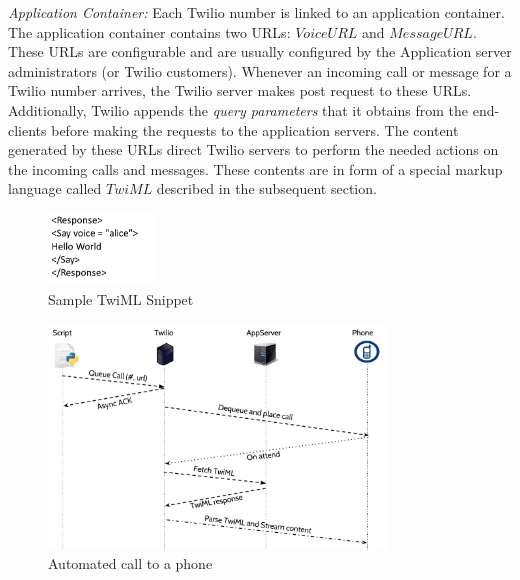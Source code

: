 \emph{Application Container: } Each Twilio number is linked to an application container. The application container contains two URLs: $Voice URL$ and $Message URL$. These URLs are configurable and are usually configured by the Application server administrators (or Twilio customers). Whenever an incoming call or message for a Twilio number arrives, the Twilio server makes post request to these URLs. Additionally, Twilio appends the \textit{query parameters} that it obtains from the end-clients before making the requests to the application servers. The content generated by these URLs direct Twilio servers to perform the needed actions on the incoming calls and messages. These contents are in form of a special markup language called $TwiML$ described in the subsequent section.  
 \begin{figure}
 \centering
   \includegraphics[width=0.25\textwidth]{figs/TwiML.png}
 \caption{Sample TwiML Snippet}
 \label{fig:TwilML}
 \end{figure} 
\begin{figure}[t!] 
\centering
  \includegraphics[width=0.8\textwidth]{figs/auto.pdf}
\caption{Automated call to a phone}
\label{fig:autocall}
\end{figure} 

